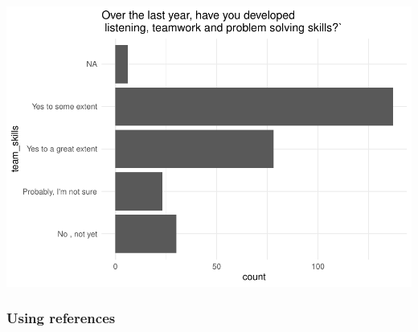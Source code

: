 \documentclass[
]{aft}
\begin{document}
\includegraphics{journal_article_files/figure-pdf/unnamed-chunk-16-3.pdf}

\hypertarget{using-references}{%
\subsubsection*{Using references}\label{using-references}}


  
\end{document}
